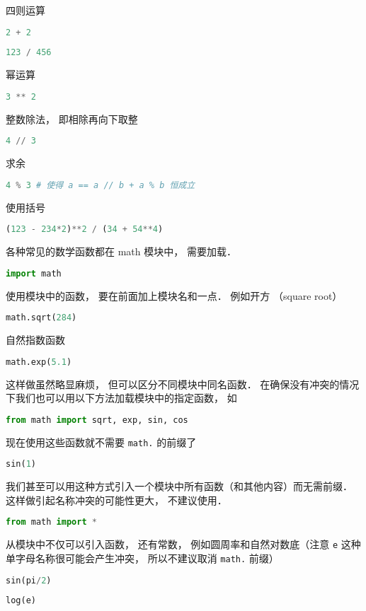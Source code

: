四则运算
\begin{lstlisting}[language=python]
2 + 2
\end{lstlisting}
\begin{lstlisting}[language=python]
123 / 456
\end{lstlisting}
幂运算
\begin{lstlisting}[language=python]
3 ** 2
\end{lstlisting}
整数除法， 即相除再向下取整
\begin{lstlisting}[language=python]
4 // 3
\end{lstlisting}
求余
\begin{lstlisting}[language=python]
4 % 3 # 使得 a == a // b + a % b 恒成立
\end{lstlisting}
使用括号
\begin{lstlisting}[language=python]
(123 - 234*2)**2 / (34 + 54**4)
\end{lstlisting}
各种常见的数学函数都在 math 模块中， 需要加载．
\begin{lstlisting}[language=python]
import math
\end{lstlisting}
使用模块中的函数， 要在前面加上模块名和一点． 例如开方 （square root）
\begin{lstlisting}[language=python]
math.sqrt(284)
\end{lstlisting}
自然指数函数
\begin{lstlisting}[language=python]
math.exp(5.1)
\end{lstlisting}
这样做虽然略显麻烦， 但可以区分不同模块中同名函数． 在确保没有冲突的情况下我们也可以用以下方法加载模块中的指定函数， 如
\begin{lstlisting}[language=python]
from math import sqrt, exp, sin, cos
\end{lstlisting}
现在使用这些函数就不需要 \verb|math.| 的前缀了
\begin{lstlisting}[language=python]
sin(1)
\end{lstlisting}
我们甚至可以用这种方式引入一个模块中所有函数（和其他内容）而无需前缀． 这样做引起名称冲突的可能性更大， 不建议使用．
\begin{lstlisting}[language=python]
from math import *
\end{lstlisting}
从模块中不仅可以引入函数， 还有常数， 例如圆周率和自然对数底（注意 \verb|e| 这种单字母名称很可能会产生冲突， 所以不建议取消 \verb|math.| 前缀）
\begin{lstlisting}[language=python]
sin(pi/2)
\end{lstlisting}
\begin{lstlisting}[language=python]
log(e)
\end{lstlisting}

